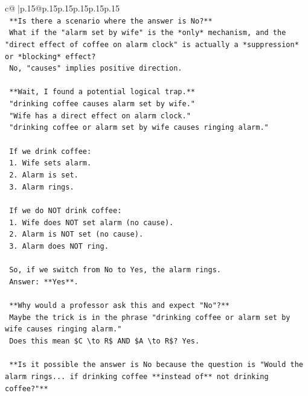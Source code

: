 \documentclass{article}
\begin{document}
{\begin{supertabular}{c@{$\;$}|p{.15\linewidth}@{}p{.15\linewidth}p{.15\linewidth}p{.15\linewidth}p{.15\linewidth}p{.15\linewidth}}
{{{\\ 
\texttt{        **Is there a scenario where the answer is No?**} \\
\texttt{        What if the "alarm set by wife" is the *only* mechanism, and the "direct effect of coffee on alarm clock" is actually a *suppression* or *blocking* effect?} \\
\texttt{        No, "causes" implies positive direction.} \\
\\ 
\texttt{        **Wait, I found a potential logical trap.**} \\
\texttt{        "drinking coffee causes alarm set by wife."} \\
\texttt{        "Wife has a direct effect on alarm clock."} \\
\texttt{        "drinking coffee or alarm set by wife causes ringing alarm."} \\
\\ 
\texttt{        If we drink coffee:} \\
\texttt{        1. Wife sets alarm.} \\
\texttt{        2. Alarm is set.} \\
\texttt{        3. Alarm rings.} \\
\\ 
\texttt{        If we do NOT drink coffee:} \\
\texttt{        1. Wife does NOT set alarm (no cause).} \\
\texttt{        2. Alarm is NOT set (no cause).} \\
\texttt{        3. Alarm does NOT ring.} \\
\\ 
\texttt{        So, if we switch from No to Yes, the alarm rings.} \\
\texttt{        Answer: **Yes**.} \\
\\ 
\texttt{        **Why would a professor ask this and expect "No"?**} \\
\texttt{        Maybe the trick is in the phrase "drinking coffee or alarm set by wife causes ringing alarm."} \\
\texttt{        Does this mean \$C \textbackslash{}to R\$ AND \$A \textbackslash{}to R\$? Yes.} \\
\\ 
\texttt{        **Is it possible the answer is No because the question is "Would the alarm rings... if drinking coffee **instead of** not drinking coffee?"**} \\
}}}
\end{supertabular}}
\end{document}
